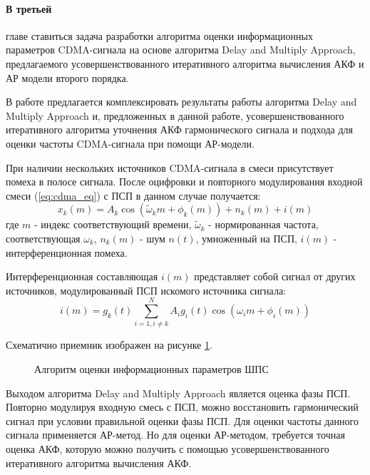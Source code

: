 \paragraph{В третьей} главе ставиться задача разработки алгоритма оценки информационных параметров CDMA-сигнала на основе алгоритма Delay and Multiply Approach,
предлагаемого усовершенствованного итеративного алгоритма вычисления АКФ и АР модели второго порядка.

В работе предлагается комплексировать результаты работы алгоритма Delay and Multiply Approach и, предложенных
в данной работе, усовершенствованного итеративного алгоритма уточнения АКФ гармонического
сигнала и подхода для оценки частоты CDMA-сигнала при помощи АР-модели.

При наличии нескольких источников CDMA-сигнала в смеси присутствует помеха в полосе сигнала.
После оцифровки и повторного модулирования входной смеси (\ref{eq:cdma_eq}) с ПСП в данном случае получается:
\begin{equation}
	\label{eq:cdma_strip_eq}
	x_k(m) = A_k \cos{(\tilde{\omega}_{k}m + \phi_k(m))} + n_k(m) + i(m)
\end{equation}
где ${m}$ - индекс соответствующий времени, ${\tilde{\omega}_k}$ - нормированная частота, соответствующая ${\omega_k}$, ${n_k}(m)$ - шум ${n(t)}$, умноженный на ПСП,
${i(m)}$ - интерференционная помеха.

Интерференционная составляющая ${i(m)}$ представляет собой сигнал от других источников, модулированный ПСП искомого источника сигнала:
\begin{equation}
	\label{eq:cdma_interference}
	i(m) = g_k(t) \sum\limits_{i=1, i \ne k}^{N}A_i g_i(t)\cos{(\omega_{i}m + \phi_i(m))}
\end{equation}

Схематично приемник изображен на рисунке \ref{pic:ar_dma_scheme}.
\begin{figure}[h]
\center{}
	\caption{Алгоритм оценки информационных параметров ШПС}
	\label{pic:ar_dma_scheme}
\end{figure}

Выходом алгоритма Delay and Multiply Approach является оценка фазы ПСП. Повторно модулируя входную смесь с ПСП,
можно восстановить гармонический сигнал при условии правильной оценки фазы ПСП. Для оценки частоты данного сигнала применяется
АР-метод. Но для оценки АР-методом, требуется точная оценка АКФ, которую можно получить
с помощью усовершенствованного итеративного алгоритма вычисления АКФ.

